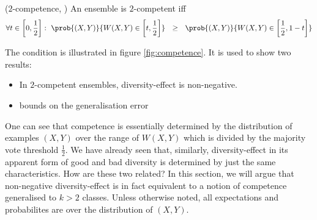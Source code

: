 \documentclass[../main.tex]{subfiles}
\begin{document}
\begin{definition} 
   \label{def:2-competence} 
    ($2$-competence, \cite{theisen_WhenAreEnsembles_2023}) An ensemble is $2$-competent iff
$$
\forall t \in \left[ 0, \frac{1}{2} \right]: ~ \prob{(X,Y) }{W(X,Y)  \in \left[ t, \frac{1}{2} \right]} ~ ~  \geq ~ ~ \prob{(X,Y) }{W(X,Y) \in \left[ \frac{1}{2}, 1-t \right]}
$$
\end{definition}
The condition is illustrated in figure \ref{fig:competence}.  
It is used to show two results:
\begin{itemize}
	\item In $2$-competent ensembles, diversity-effect is non-negative.
	\item bounds on the generalisation error  %
\end{itemize}

One can see that competence is essentially determined by the distribution of examples $(X,Y)$ over the range of $W(X,Y)$ which is divided by the majority vote threshold $\frac{1}{2}$. We have already seen that, similarly, diversity-effect in its apparent form of good and bad diversity is determined by just the same characteristics. How are these two related?
In this section, we will argue that non-negative diversity-effect is in fact equivalent to a notion of competence generalised to $k > 2$ classes. Unless otherwise noted, all expectations and probabilites are over the distribution of $(X,Y)$.
\end{document}
